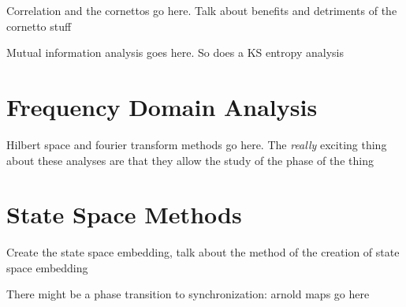 \documentclass[12pt]{article}
\begin{document}

Correlation and the cornettos go here. Talk about benefits and detriments of the cornetto stuff


Mutual information analysis goes here. So does a KS entropy analysis

\section{Frequency Domain Analysis}
Hilbert space and fourier transform methods go here. The \emph{really} exciting thing about these analyses are that they allow the study of the phase of the thing


\section{State Space Methods}

Create the state space embedding, talk about the method of the creation of state space embedding

There might be a phase transition to synchronization: arnold maps go here

%
%
%
%
%
%
%
\end{document}
